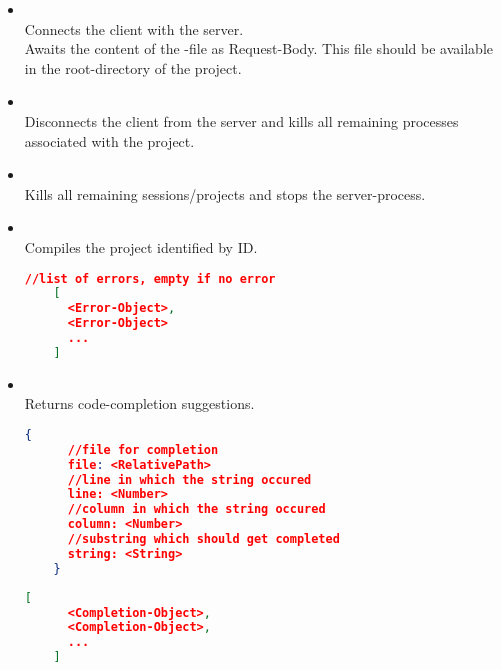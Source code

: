 






\newpage
\newpage
\begin{itemize}
  \item {} \\
  Connects the client with the server. \\
  Awaits the content of the  -file as Request-Body. This file should be
  available in the root-directory of the project. \\

  \item {} \\
  Disconnects the client from the server and kills all remaining processes associated
  with the project. \\

  \item {} \\
  Kills all remaining sessions/projects and stops the server-process. \\

  \item {} \\
  Compiles the project identified by ID. \\
  \begin{lstlisting}[basicstyle=\small,language=json]
    //list of errors, empty if no error
    [
      <Error-Object>,
      <Error-Object>
      ...
    ]
  \end{lstlisting}

  \item {} \\
  Returns code-completion suggestions. \\
  \begin{lstlisting}[basicstyle=\small,
    language=json]
    {
      //file for completion
      file: <RelativePath>
      //line in which the string occured
      line: <Number>
      //column in which the string occured
      column: <Number>
      //substring which should get completed
      string: <String>
    }
  \end{lstlisting}
  \begin{lstlisting}[basicstyle=\small,
    language=json]
    [
      <Completion-Object>,
      <Completion-Object>,
      ...
    ]
  \end{lstlisting}
\end{itemize}

